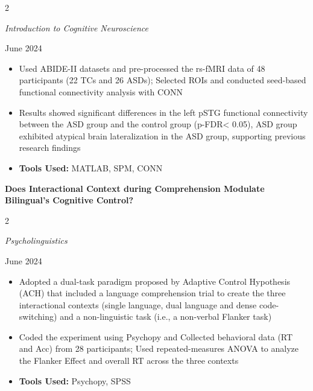 \documentclass[10pt, letterpaper]{article}
\newenvironment{highlights}{
    \begin{itemize}[
        topsep=0.10 cm,
        parsep=0.10 cm,
        partopsep=0pt,
        itemsep=0pt,
        leftmargin=0 cm + 10pt
    ]
}{
    \end{itemize}
} %
\newenvironment{twocolentry}[2][]{
    \onecolentry
    \def\secondColumn{#2}
    \setcolumnwidth{\fill, 4.5 cm}
    \begin{paracol}{2}
}{
    \switchcolumn \raggedleft \secondColumn
    \end{paracol}
    \endonecolentry
} %
\begin{document}
        \vspace{0.10cm}

        \begin{twocolentry}{
            June 2024
        }
            \textit{Introduction to Cognitive Neuroscience}
        \end{twocolentry}

        \vspace{0.10 cm}

        \begin{highlights}
            \item Used ABIDE-II datasets and pre-processed the rs-fMRI data of 48 participants (22 TCs and 26 ASDs); Selected ROIs and conducted seed-based functional connectivity analysis with CONN  
            \item Results showed significant differences in the left pSTG functional connectivity between the ASD group and the control group (p-FDR< 0.05), ASD group exhibited atypical brain lateralization in the ASD group, supporting previous research findings  
            \item \textbf{Tools Used:} MATLAB, SPM, CONN
        \end{highlights}
        
      
    
      
        \textbf{Does Interactional Context during Comprehension Modulate Bilingual’s Cognitive Control?}

        \vspace{0.10cm}

        \begin{twocolentry}{
            June 2024
        }
            \textit{Psycholinguistics}
        \end{twocolentry}

         \vspace{0.10 cm}

         \begin{highlights}
            \item Adopted a dual-task paradigm proposed by Adaptive Control Hypothesis (ACH) that included a language comprehension trial to create the three interactional contexts (single language, dual language and dense code-switching) and a non-linguistic task (i.e., a non-verbal Flanker task)   
            \item Coded the experiment using Psychopy and Collected behavioral data (RT and Acc) from 28 participants; Used repeated-measures ANOVA to analyze the Flanker Effect and overall RT across the three contexts   
            \item \textbf{Tools Used:} Psychopy, SPSS
         \end{highlights}
\end{document}
